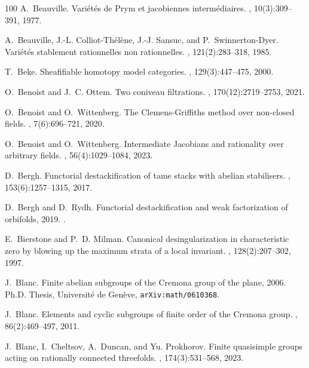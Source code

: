 \documentclass[12pt,reqno]{amsart}
\theoremstyle{plain}
\theoremstyle{remark}
\theoremstyle{definition}
\numberwithin{equation}{section}
\begin{document}
\begin{thebibliography}{100}
A.~Beauville.
\newblock Vari\'{e}t\'{e}s de {P}rym et jacobiennes interm\'{e}diaires.
, 10(3):309--391, 1977.

A.~Beauville, J.-L. Colliot-Th\'{e}l\`ene, J.-J. Sansuc, and
  P.~Swinnerton-Dyer.
\newblock Vari\'{e}t\'{e}s stablement rationnelles non rationnelles.
, 121(2):283--318, 1985.

T.~Beke.
\newblock Sheafifiable homotopy model categories.
, 129(3):447--475, 2000.

O.~Benoist and J.~C. Ottem.
\newblock Two coniveau filtrations.
, 170(12):2719--2753, 2021.

O.~Benoist and O.~Wittenberg.
\newblock The {C}lemens-{G}riffiths method over non-closed fields.
, 7(6):696--721, 2020.

O.~Benoist and O.~Wittenberg.
\newblock Intermediate {J}acobians and rationality over arbitrary fields.
, 56(4):1029--1084, 2023.

D.~Bergh.
\newblock Functorial destackification of tame stacks with abelian stabilisers.
, 153(6):1257--1315, 2017.

D.~Bergh and D.~Rydh.
\newblock Functorial destackification and weak factorization of orbifolds,
  2019.
.

E.~Bierstone and P.~D. Milman.
\newblock Canonical desingularization in characteristic zero by blowing up the
  maximum strata of a local invariant.
, 128(2):207--302, 1997.

J.~Blanc.
\newblock Finite abelian subgroups of the {C}remona group of the plane, 2006.
\newblock Ph.D. Thesis, Universit\'e de Gen\`eve, {\tt arXiv:math/0610368}.

J.~Blanc.
\newblock Elements and cyclic subgroups of finite order of the {C}remona group.
, 86(2):469--497, 2011.

J.~Blanc, I.~Cheltsov, A.~Duncan, and Yu. Prokhorov.
\newblock Finite quasisimple groups acting on rationally connected threefolds.
, 174(3):531--568, 2023.


\end{thebibliography}
\end{document}
